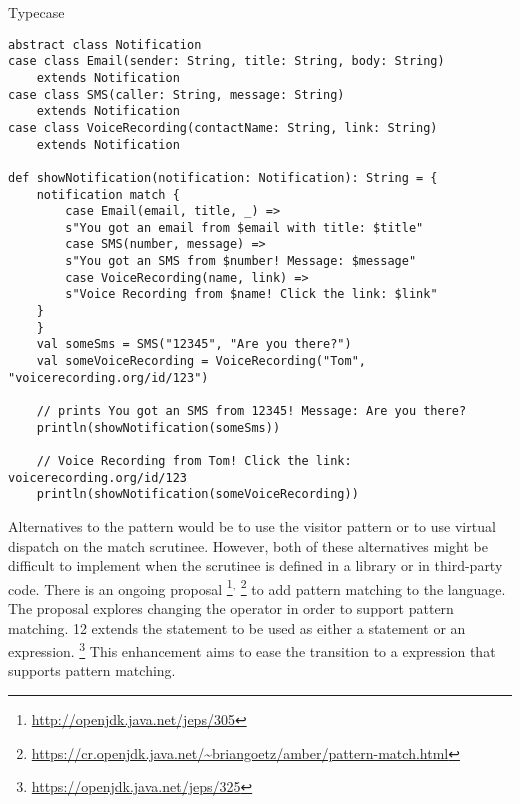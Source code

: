 \begin{pattern}{Typecase}
\begin{verbatim}
abstract class Notification
case class Email(sender: String, title: String, body: String)
	extends Notification
case class SMS(caller: String, message: String)
	extends Notification
case class VoiceRecording(contactName: String, link: String)
	extends Notification

def showNotification(notification: Notification): String = {
	notification match {
		case Email(email, title, _) =>
		s"You got an email from $email with title: $title"
		case SMS(number, message) =>
		s"You got an SMS from $number! Message: $message"
		case VoiceRecording(name, link) =>
		s"Voice Recording from $name! Click the link: $link"
	}
	}
	val someSms = SMS("12345", "Are you there?")
	val someVoiceRecording = VoiceRecording("Tom", "voicerecording.org/id/123")
	
	// prints You got an SMS from 12345! Message: Are you there?
	println(showNotification(someSms))
	
	// Voice Recording from Tom! Click the link: voicerecording.org/id/123	
	println(showNotification(someVoiceRecording))
\end{verbatim}

Alternatives to the \thisp{} pattern would be to use the visitor pattern or to
use virtual dispatch on the match scrutinee.
However, both of these
alternatives might be difficult to implement when the scrutinee is defined in
a library or in third-party code.
There is an ongoing proposal%
\footnote{\url{http://openjdk.java.net/jeps/305}}$^{,}$%
\footnote{\url{https://cr.openjdk.java.net/~briangoetz/amber/pattern-match.html}}
to add pattern matching to the \java{} language.
The proposal explores changing the  operator in order to support pattern matching.
%
%
\java{} 12 extends the  statement to be used as either a statement or an expression.%
\footnote{\url{https://openjdk.java.net/jeps/325}}
This enhancement aims to ease the transition to a  expression that supports pattern matching.


\related{}








\end{pattern}
